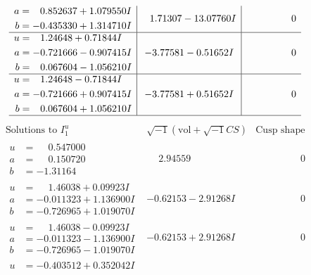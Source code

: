 \documentclass[1p]{elsarticle_modified}
\theoremstyle{definition}
\newcommand{\I}{\sqrt{-1}}
\begin{document}
$$\begin{array}{c|c|c}
\begin{aligned}
a &= \phantom{-}0.852637 + 1.079550 I \\
b &= -0.435330 + 1.314710 I\end{aligned}
 & \phantom{-}1.71307 - 13.07760 I & \phantom{-0.000000 } 0 \\ \hline\begin{aligned}
u &= \phantom{-}1.24648 + 0.71844 I \\
a &= -0.721666 - 0.907415 I \\
b &= \phantom{-}0.067604 - 1.056210 I\end{aligned}
 & -3.77581 - 0.51652 I & \phantom{-0.000000 } 0 \\ \hline\begin{aligned}
u &= \phantom{-}1.24648 - 0.71844 I \\
a &= -0.721666 + 0.907415 I \\
b &= \phantom{-}0.067604 + 1.056210 I\end{aligned}
 & -3.77581 + 0.51652 I & \phantom{-0.000000 } 0\\
 \hline 
 \end{array}$$\newpage$$\begin{array}{c|c|c}  
\text{Solutions to }I^u_{1}& \I (\text{vol} + \sqrt{-1}CS) & \text{Cusp shape}\\
 \hline 
\begin{aligned}
u &= \phantom{-}0.547000\phantom{ +0.000000I} \\
a &= \phantom{-}0.150720\phantom{ +0.000000I} \\
b &= -1.31164\phantom{ +0.000000I}\end{aligned}
 & \phantom{-}2.94559\phantom{ +0.000000I} & \phantom{-0.000000 } 0 \\ \hline\begin{aligned}
u &= \phantom{-}1.46038 + 0.09923 I \\
a &= -0.011323 + 1.136900 I \\
b &= -0.726965 + 1.019070 I\end{aligned}
 & -0.62153 - 2.91268 I & \phantom{-0.000000 } 0 \\ \hline\begin{aligned}
u &= \phantom{-}1.46038 - 0.09923 I \\
a &= -0.011323 - 1.136900 I \\
b &= -0.726965 - 1.019070 I\end{aligned}
 & -0.62153 + 2.91268 I & \phantom{-0.000000 } 0 \\ \hline\begin{aligned}
u &= -0.403512 + 0.352042 I \\

\end{aligned}
\end{array}$$
\end{document}
